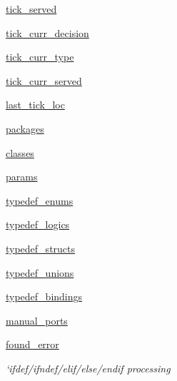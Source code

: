 \begin{DoxyCompactItemize}
\item 
\hyperlink{classsrc_1_1verilog__parser_1_1verilog__parser_a648196e70fb7e82ac29ab300a162d055}{tick\-\_\-served}
\item 
\hyperlink{classsrc_1_1verilog__parser_1_1verilog__parser_a0c1a032cbfb2282c87c68f1670399c0d}{tick\-\_\-curr\-\_\-decision}
\item 
\hyperlink{classsrc_1_1verilog__parser_1_1verilog__parser_a09e28ad43e48089e1f58d1b858aa5fa2}{tick\-\_\-curr\-\_\-type}
\item 
\hyperlink{classsrc_1_1verilog__parser_1_1verilog__parser_a4a833b74a2be85c3719261328722e371}{tick\-\_\-curr\-\_\-served}
\item 
\hyperlink{classsrc_1_1verilog__parser_1_1verilog__parser_a942af18cb73658579b4a9c277086f3cd}{last\-\_\-tick\-\_\-loc}
\item 
\hyperlink{classsrc_1_1verilog__parser_1_1verilog__parser_a12004b8cf62949956ae314ef476dab87}{packages}
\item 
\hyperlink{classsrc_1_1verilog__parser_1_1verilog__parser_a47eeccd54b5c7c35a8836faaf6a9bde7}{classes}
\item 
\hyperlink{classsrc_1_1verilog__parser_1_1verilog__parser_a7c108505c58a79df46601966e54a23db}{params}
\item 
\hyperlink{classsrc_1_1verilog__parser_1_1verilog__parser_a1c9d4e2a68d2cfefb74f0d4a4ff9d3e7}{typedef\-\_\-enums}
\item 
\hyperlink{classsrc_1_1verilog__parser_1_1verilog__parser_a523203cbac7ad76b0c193c4ab57c1ff8}{typedef\-\_\-logics}
\item 
\hyperlink{classsrc_1_1verilog__parser_1_1verilog__parser_a2f3d97d651c6748ef49e137c39a88613}{typedef\-\_\-structs}
\item 
\hyperlink{classsrc_1_1verilog__parser_1_1verilog__parser_a72b450cd8097ca7d0b7f63acb4d4c281}{typedef\-\_\-unions}
\item 
\hyperlink{classsrc_1_1verilog__parser_1_1verilog__parser_ac58bfda0c6c3b46dddf4965f0fbf818f}{typedef\-\_\-bindings}
\item 
\hyperlink{classsrc_1_1verilog__parser_1_1verilog__parser_a3a27f85383ea07970dbccc29bc68ea06}{manual\-\_\-ports}
\item 
\hyperlink{classsrc_1_1verilog__parser_1_1verilog__parser_a259774d2a3cc74fd78518fcaabf3867e}{found\-\_\-error}
\begin{DoxyCompactList}\small\item\em `ifdef/ifndef/elif/else/endif processing \end{DoxyCompactList}\item 

\end{DoxyCompactItemize}
